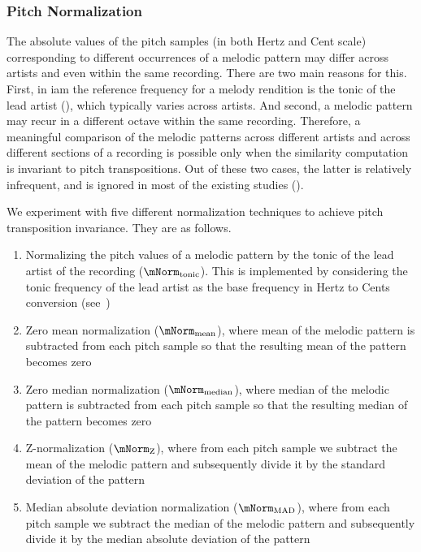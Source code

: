 \subsubsection{Pitch Normalization}
\label{sec:patterns_melodic_similarity_transposition_invariance}

The absolute values of the pitch samples (in both Hertz and Cent scale) corresponding to different occurrences of a melodic pattern may differ across artists and even within the same recording. There are two main reasons for this. First, in \gls{iam} the reference frequency for a melody rendition is the tonic of the lead artist (), which typically varies across artists. And second, a melodic pattern may recur in a different octave within the same recording. Therefore, a meaningful comparison of the melodic patterns across different artists and across different sections of a recording is possible only when the similarity computation is invariant to pitch transpositions. Out of these two cases, the latter is relatively infrequent, and is ignored in most of the existing studies ().

We experiment with five different normalization techniques to achieve pitch transposition invariance. They are as follows. 

\begin{enumerate}
	\item Normalizing the pitch values of a melodic pattern by the tonic of the lead artist of the recording ($\mNorm_{\mathrm{tonic}}$). This is implemented by considering the tonic frequency of the lead artist as the base frequency in Hertz to Cents conversion (see~)

	\item Zero mean normalization ($\mNorm_{\mathrm{mean}}$), where mean of the melodic pattern is subtracted from each pitch sample so that the resulting mean of the pattern becomes zero
	
	\item Zero median normalization ($\mNorm_{\mathrm{median}}$), where median of the melodic pattern is subtracted from each pitch sample so that the resulting median of the pattern becomes zero
	\item Z-normalization ($\mNorm_{\mathrm{Z}}$), where from each pitch sample we subtract the mean of the melodic pattern and subsequently divide it by the standard deviation of the pattern
	\item Median absolute deviation normalization ($\mNorm_{\mathrm{MAD}}$), where from each pitch sample we subtract the median of the melodic pattern and subsequently divide it by the median absolute deviation of the pattern
\end{enumerate}

